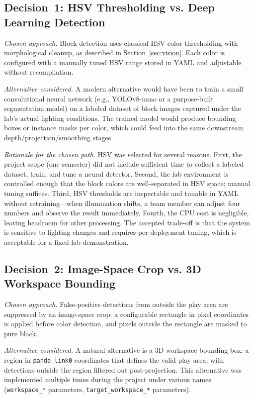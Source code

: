 \documentclass[conference]{IEEEtran}
\begin{document}
\subsection{Decision~1: HSV Thresholding vs. Deep Learning Detection}

\textit{Chosen approach.} Block detection uses classical HSV color
thresholding with morphological cleanup, as described in
Section~\ref{sec:vision}. Each color is configured with a manually
tuned HSV range stored in YAML and adjustable without recompilation.

\textit{Alternative considered.} A modern alternative would have been
to train a small convolutional neural network (e.g., YOLOv8-nano or a
purpose-built segmentation model) on a labeled dataset of block images
captured under the lab's actual lighting conditions. The trained
model would produce bounding boxes or instance masks per color, which
could feed into the same downstream depth/projection/smoothing stages.

\textit{Rationale for the chosen path.} HSV was selected for several
reasons. First, the project scope (one semester) did not include
sufficient time to collect a labeled dataset, train, and tune a neural
detector. Second, the lab environment is controlled enough that the
block colors are well-separated in HSV space; manual tuning suffices.
Third, HSV thresholds are inspectable and tunable in YAML without
retraining---when illumination shifts, a team member can adjust four
numbers and observe the result immediately. Fourth, the CPU cost is
negligible, leaving headroom for other processing. The accepted
trade-off is that the system is sensitive to lighting changes and
requires per-deployment tuning, which is acceptable for a fixed-lab
demonstration.

\subsection{Decision~2: Image-Space Crop vs. 3D Workspace Bounding}

\textit{Chosen approach.} False-positive detections from outside the
play area are suppressed by an image-space crop: a configurable
rectangle in pixel coordinates is applied before color detection,
and pixels outside the rectangle are masked to pure black.

\textit{Alternative considered.} A natural alternative is a 3D
workspace bounding box: a region in \texttt{panda\_link0} coordinates
that defines the valid play area, with detections outside the region
filtered out post-projection. This alternative was implemented multiple
times during the project under various names (\texttt{workspace\_*}
parameters, \texttt{target\_workspace\_*} parameters).
\end{document}
